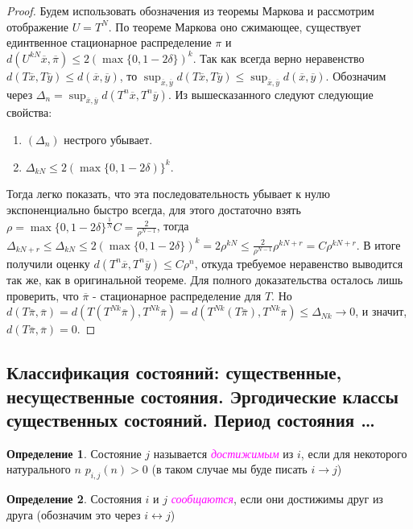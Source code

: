 \documentclass[a4paper,100pt]{article}
\theoremstyle{indented}
\theoremstyle{definition}
\newtheorem{defn}{Определение}
\theoremstyle{remark}
\begin{document}
\begin{proof}
Будем использовать обозначения из теоремы Маркова и рассмотрим отображение $U=T^N$. По теореме Маркова оно сжимающее, существует единтвенное стационарное распределение $\pi$ и $d(U^{kN}\overline{x}, \overline{\pi}) \leq 2(\max\{0, 1-2\delta\})^k$. Так как всегда верно неравенство $d(T\overline{x}, T\overline{y}) \leq d(\overline{x}, \overline{y})$, то $\sup_{\overline{x}, \overline{y}} d(T\overline{x}, T\overline{y}) \leq \sup_{\overline{x}, \overline{y}} d(\overline{x}, \overline{y})$. Обозначим через $\Delta_n=\sup_{\overline{x}, \overline{y}} d(T^n\overline{x}, T^n\overline{y})$. Из вышесказанного следуют следующие свойства:
\begin{enumerate}
    \item $(\Delta_n)$  нестрого убывает.
    \item $\Delta_{kN} \leq 2(\max\{0, 1-2\delta)\}^k$. 
\end{enumerate}
Тогда легко показать, что эта последовательность убывает к нулю экспоненциально быстро всегда, для этого достаточно взять $\rho=\max\{0, 1-2\delta\}^{\frac{1}{N}}C=\frac{2}{\rho^{N-1}}$, тогда $\Delta_{kN+r} \leq \Delta_{kN} \leq 2(\max\{0, 1-2\delta\})^k=2\rho^{kN} \leq \frac{2}{\rho^{N-1}}\rho^{kN+r}=C\rho^{kN+r}$. В итоге получили оценку $d(T^n\overline{x}, T^n\overline{y}) \leq C\rho^n$, откуда требуемое неравенство выводится так же, как в оригинальной теореме. Для полного доказательства осталось лишь проверить, что $\overline{\pi}$ - стационарное распределение для $T$. Но $d(T\overline{\pi}, \overline{\pi}) = d(T(T^{Nk}\overline{\pi}), T^{Nk}\overline{\pi})=d(T^{Nk}(T\overline{\pi}), T^{Nk}\overline{\pi}) \leq \Delta_{Nk} \rightarrow 0$, и значит, $d(T\overline{\pi}, \overline{\pi})=0$.
\end{proof}

\subsection{Классификация состояний: существенные, несущественные состояния. Эргодические классы существенных состояний. Период состояния \ldots}

\begin{defn}
  Состояние $j$ называется \hypertarget{n36}{\textcolor{magenta}{\textit{достижимым}}} из $i$, если для некоторого натурального $n$ $p_{i, j}(n)>0$ (в таком случае мы буде писать $i \rightarrow j$)
\end{defn}

\begin{defn}
  Состояния $i$ и $j$ \hypertarget{n37}{\textcolor{magenta}{\textit{сообщаются}}}, если они достижимы друг из друга (обозначим это через $i \leftrightarrow j$)
\end{defn}
\end{document}
